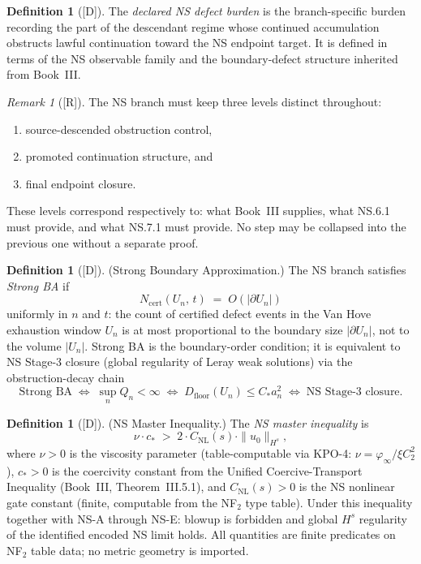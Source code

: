 \documentclass[12pt,oneside]{amsbook}
\theoremstyle{plain}
\theoremstyle{definition}
\newtheorem{definition}[theorem]{Definition}
\theoremstyle{remark}
\newtheorem{remark}[theorem]{Remark}
\newcommand{\status}[1]{\textup{[#1]}}
\begin{document}
\begin{definition}[\status{D}]\label{def:NS-defect-burden}
The \emph{declared NS defect burden} is the branch-specific
burden recording the part of the descendant regime whose
continued accumulation obstructs lawful continuation toward the
NS endpoint target. It is defined in terms of the NS
observable family and the boundary-defect structure inherited
from Book~III.
\end{definition}

\begin{remark}[\status{R}]\label{rmk:NS-three-levels}
The NS branch must keep three levels distinct throughout:
\begin{enumerate}[label=\textup{(\arabic*)}]
 \item source-descended obstruction control,
 \item promoted continuation structure, and
 \item final endpoint closure.
\end{enumerate}
These levels correspond respectively to: what Book~III supplies,
what NS.6.1 must provide, and what NS.7.1 must provide. No
step may be collapsed into the previous one without a separate
proof.
\end{remark}
\begin{definition}[\status{D}]\label{def:NS-strong-ba}
\textup{(Strong Boundary Approximation.)}
The NS branch satisfies \emph{Strong BA} if
\[
 N_{\mathrm{cert}}(U_n,\,t) \;=\; O(|\partial U_n|)
\]
uniformly in $n$ and $t$: the count of certified defect events in the
Van Hove exhaustion window $U_n$ is at most proportional to the
boundary size $|\partial U_n|$, not to the volume $|U_n|$. Strong
BA is the boundary-order condition; it is equivalent to NS Stage-3
closure (global regularity of Leray weak solutions) via the
obstruction-decay chain
\[
 \text{Strong BA}
 \;\Longleftrightarrow\;
 \sup_n Q_n < \infty
 \;\Longleftrightarrow\;
 D_{\mathrm{floor}}(U_n) \leq C_* a_n^2
 \;\Longleftrightarrow\;
 \text{NS Stage-3 closure.}
\]
\end{definition}

\begin{definition}[\status{D}]\label{def:NS-master-inequality}
\textup{(NS Master Inequality.)}
The \emph{NS master inequality} is
\[
 \nu \cdot c_* \;>\; 2 \cdot C_{\mathrm{NL}}(s) \cdot \|u_0\|_{H^s},
\]
where $\nu > 0$ is the viscosity parameter (table-computable via
KPO-4: $\nu = \varphi_\infty / \xi C_2^2$), $c_* > 0$ is the
coercivity constant from the Unified Coercive-Transport Inequality
(Book~III, Theorem~III.5.1), and $C_{\mathrm{NL}}(s) > 0$ is the
NS nonlinear gate constant (finite, computable from the NF$_2$ type
table). Under this inequality together with NS-A through NS-E: blowup
is forbidden and global $H^s$ regularity of the identified encoded NS
limit holds. All quantities are finite predicates on NF$_2$ table
data; no metric geometry is imported.
\end{definition}
\end{document}
